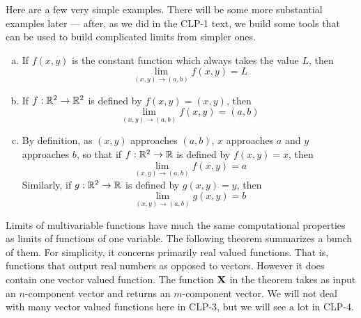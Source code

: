 Here are a few very simple examples. There will be some more substantial examples later --- after, as we did in the CLP-1 text, we build some tools 
that can be used to build complicated limits from simpler ones.
\begin{eg}\label{eg trivial limits}
\begin{enumerate}[(a)]
\item
If $f(x,y)$ is the constant function which always takes the value $L$,
then
\begin{equation*}
\lim_{(x,y)\to(a,b)} f(x,y) = L
\end{equation*}

\item
If $f:\mathbb{R}^2\rightarrow\mathbb{R}^2$ is defined by $f(x,y) = (x,y)$,
then 
\begin{equation*}
\lim_{(x,y)\to(a,b)} f(x,y) = (a,b)
\end{equation*}

\item
By definition, as $(x,y)$ approaches $(a,b)$, $x$ approaches $a$
and $y$ approaches $b$, so that
if $f:\mathbb{R}^2\rightarrow\mathbb{R}$ is defined by $f(x,y) = x$,
then 
\begin{equation*}
\lim_{(x,y)\to(a,b)} f(x,y) = a
\end{equation*}
Similarly, if $g:\mathbb{R}^2\rightarrow\mathbb{R}$ is defined by $g(x,y) = y$,
then 
\begin{equation*}
\lim_{(x,y)\to(a,b)} g(x,y) = b
\end{equation*}

\end{enumerate}

\end{eg}

Limits of multivariable functions have much the same 
computational properties as limits of functions of one variable.
The following theorem summarizes a bunch of them. For simplicity,
it concerns primarily real valued functions. That is, functions that output
real numbers as opposed to vectors. However it does contain one
vector valued function. The function $\mathbf{X}$ in the theorem takes as input
an $n$-component vector and returns an $m$-component vector.
We will not deal with many vector valued functions here in CLP-3,
but we will see a lot in CLP-4.


